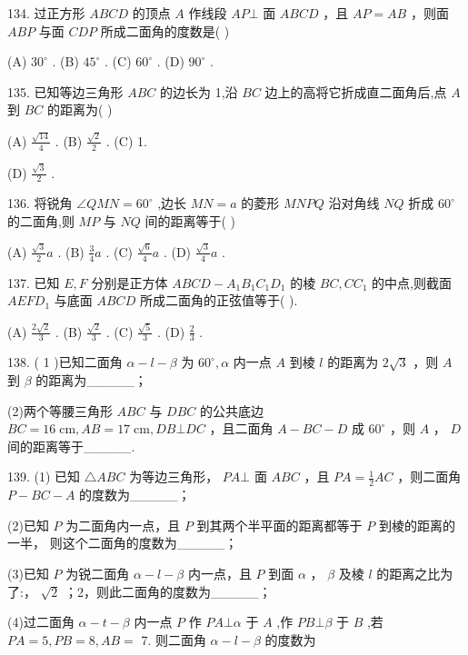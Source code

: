 \documentclass[10pt]{article}
\begin{document}
134. 过正方形 \({ABCD}\) 的顶点 \(A\) 作线段 \({AP} \bot\) 面 \({ABCD}\) ，且 \({AP} = {AB}\) ，则面 \({ABP}\) 与面 \({CDP}\) 所成二面角的度数是( )

(A) \({30}^{ \circ  }\) . (B) \({45}^{ \circ  }\) . (C) \({60}^{ \circ  }\) . (D) \({90}^{ \circ  }\) .

135. 已知等边三角形 \({ABC}\) 的边长为 1,沿 \({BC}\) 边上的高将它折成直二面角后,点 \(A\) 到 \({BC}\) 的距离为( )

(A) \(\frac{\sqrt{14}}{4}\) . (B) \(\frac{\sqrt{2}}{2}\) . (C) 1.

(D) \(\frac{\sqrt{3}}{2}\) .

136. 将锐角 \(\angle {QMN} = {60}^{ \circ  }\) ,边长 \({MN} = a\) 的菱形 \({MNPQ}\) 沿对角线 \({NQ}\) 折成 \({60}^{ \circ  }\) 的二面角,则 \({MP}\) 与 \({NQ}\) 间的距离等于( )

(A) \(\frac{\sqrt{3}}{2}a\) . (B) \(\frac{3}{4}a\) . (C) \(\frac{\sqrt{6}}{4}a\) . (D) \(\frac{\sqrt{3}}{4}a\) .

137. 已知 \(E,F\) 分别是正方体 \({ABCD} - {A}_{1}{B}_{1}{C}_{1}{D}_{1}\) 的棱 \({BC},C{C}_{1}\) 的中点,则截面 \({AEF}{D}_{1}\) 与底面 \({ABCD}\) 所成二面角的正弦值等于( ).

(A) \(\frac{2\sqrt{2}}{3}\) . (B) \(\frac{\sqrt{2}}{3}\) . (C) \(\frac{\sqrt{5}}{3}\) . (D) \(\frac{2}{3}\) .

138. ( 1 )已知二面角 \(\alpha  - l - \beta\) 为 \({60}^{ \circ  },\alpha\) 内一点 \(A\) 到棱 \(l\) 的距离为 \(2\sqrt{3}\) ，则 \(A\) 到 \(\beta\) 的距离为\_\_\_\_\_；

(2)两个等腰三角形 \({ABC}\) 与 \({DBC}\) 的公共底边 \({BC} = {16}\mathrm{\;{cm}},{AB} = {17}\mathrm{\;{cm}},{DB} \bot  {DC}\) ，且二面角 \(A - {BC} - D\) 成 \({60}^{ \circ  }\) ，则 \(A\) ， \(D\) 间的距离等于\_\_\_\_\_.

139. (1) 已知 \(\bigtriangleup  {ABC}\) 为等边三角形， \({PA}\bot\) 面 \({ABC}\) ，且 \({PA} = \frac{1}{2}{AC}\) ，则二面角 \(P - {BC} - A\) 的度数为\_\_\_\_\_；

(2)已知 \(P\) 为二面角内一点，且 \(P\) 到其两个半平面的距离都等于 \(P\) 到棱的距离的一半， 则这个二面角的度数为\_\_\_\_\_；

(3)已知 \(P\) 为锐二面角 \(\alpha  - l - \beta\) 内一点，且 \(P\) 到面 \(\alpha\) ， \(\beta\) 及棱 \(l\) 的距离之比为了:， \(\sqrt{2}\) ；2，则此二面角的度数为\_\_\_\_\_；

(4)过二面角 \(\alpha  - t - \beta\) 内一点 \(P\) 作 \({PA} \bot  \alpha\) 于 \(A\) ,作 \({PB} \bot  \beta\) 于 \(B\) ,若 \({PA} = 5,{PB} = 8,{AB} =\) 7. 则二面角 \(\alpha  - l - \beta\) 的度数为
\end{document}
